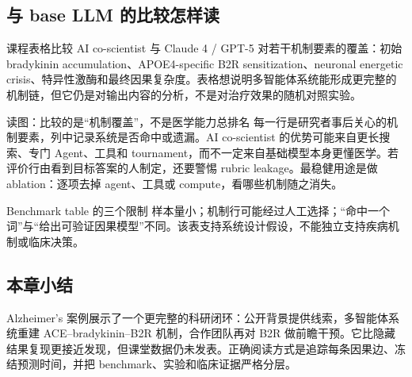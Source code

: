 
\subsection{与 base LLM 的比较怎样读}

课程表格比较 AI co-scientist 与 Claude 4 / GPT-5 对若干机制要素的覆盖：初始 bradykinin accumulation、APOE4-specific B2R sensitization、neuronal energetic crisis、特异性激酶和最终因果复杂度。表格想说明多智能体系统能形成更完整的机制链，但它仍是对输出内容的分析，不是对治疗效果的随机对照实验。


\begin{knowledgebox}{读图：比较的是“机制覆盖”，不是医学能力总排名}
每一行是研究者事后关心的机制要素，列中记录系统是否命中或遗漏。AI co-scientist 的优势可能来自更长搜索、专门 Agent、工具和 tournament，而不一定来自基础模型本身更懂医学。若评价行由看到目标答案的人制定，还要警惕 rubric leakage。最稳健用途是做 ablation：逐项去掉 agent、工具或 compute，看哪些机制随之消失。
\end{knowledgebox}

\begin{warningbox}{Benchmark table 的三个限制}
样本量小；机制行可能经过人工选择；“命中一个词”与“给出可验证因果模型”不同。该表支持系统设计假设，不能独立支持疾病机制或临床决策。
\end{warningbox}

\subsection{本章小结}

Alzheimer's 案例展示了一个更完整的科研闭环：公开背景提供线索，多智能体系统重建 ACE--bradykinin--B2R 机制，合作团队再对 B2R 做前瞻干预。它比隐藏结果复现更接近发现，但课堂数据仍未发表。正确阅读方式是追踪每条因果边、冻结预测时间，并把 benchmark、实验和临床证据严格分层。

